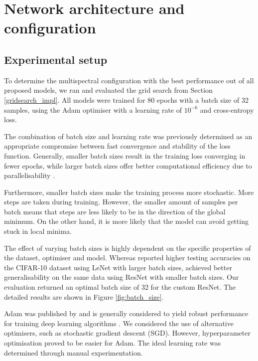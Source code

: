 \documentclass{l4proj}
\begin{document}

\section{Network architecture and configuration}
\label{eval_arch}

\subsection{Experimental setup}

To determine the multispectral configuration with the best performance out of all proposed models, we ran and evaluated the grid search from Section \ref{gridsearch_impl}. All models were trained for 80 epochs with a batch size of 32 samples, using the Adam optimiser with a learning rate of $10^{-6}$ and cross-entropy loss. 

The combination of batch size and learning rate was previously determined as an appropriate compromise between fast convergence and stability of the loss function. Generally, smaller batch sizes result in the training loss converging in fewer epochs, while larger batch sizes offer better computational efficiency due to parallelisability \citep{devarakonda_adabatch_2018}. 

Furthermore, smaller batch sizes make the training process more stochastic. More steps are taken during training. However, the smaller amount of samples per batch means that steps are less likely to be in the direction of the global minimum. On the other hand, it is more likely that the model can avoid getting stuck in local minima.

The effect of varying batch sizes is highly dependent on the specific properties of the dataset, optimiser and model. Whereas \citet{radiuk_impact_2017} reported higher testing accuracies on the CIFAR-10 dataset \citep{krizhevsky_learning_2009} using LeNet \citep{lecun_gradient-based_1998} with larger batch sizes, \citet{masters_revisiting_2018} achieved better generalisability on the same data using ResNet with smaller batch sizes. Our evaluation returned an optimal batch size of 32 for the custom ResNet. The detailed results are shown in Figure \ref{fig:batch_size}.

Adam was published by \citet{kingma_adam_2014} and is generally considered to yield robust performance for training deep learning algorithms \citep{alom_history_2018}. We considered the use of alternative optimisers, such as stochastic gradient descent (SGD). However, hyperparameter optimisation proved to be easier for Adam. The ideal learning rate was determined through manual experimentation.
\end{document}
